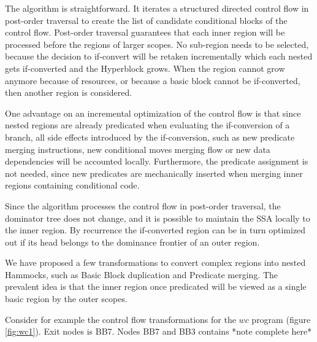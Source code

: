 The algorithm is straightforward. It iterates a structured directed control flow in post-order traversal to create the list of candidate conditional blocks of the control flow. Post-order traversal guarantees that each inner region will be processed before the regions of larger scopes. No sub-region needs to be selected, because the decision to if-convert will be retaken incrementally which each nested gets if-converted and the Hyperblock grows. When the region cannot grow anymore because of resources, or because a basic block cannot be if-converted, then another region is considered.

One advantage on an incremental optimization of the control flow is that since nested regions are already predicated when evaluating the if-conversion of a branch, all side effects introduced by the if-conversion, such as new predicate merging instructions, new conditional moves merging flow or new data dependencies will be accounted locally. Furthermore, the predicate assignment is not needed, since new predicates are mechanically inserted when merging inner regions containing conditional code.

Since the algorithm processes the control flow in post-order traversal, the dominator tree does not change, and it is possible to maintain the SSA locally to the inner region. By recurrence the if-converted region can be in turn optimized out if its head belongs to the dominance frontier of an outer region.

We have proposed a few transformations to convert complex regions into nested Hammocks, such as Basic Block duplication and Predicate merging. The prevalent idea is that the inner region once predicated will be viewed as a single basic region by the outer scopes.

Consider for example the control flow transformations for the $wc$ program (figure \ref{fig:wc1}). Exit nodes is BB7. Nodes BB7 and BB3 contains *note complete here*


